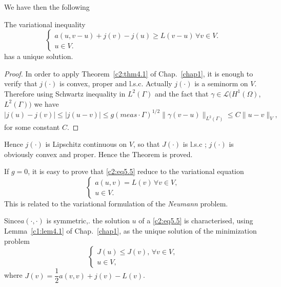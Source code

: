 We have then the following 

\begin{theorem}%
 The variational inequality
\begin{equation}
\begin{cases}
a(u, v-u) + j (v) - j (u) \geq  L (v-u)\, \forall  v \in V.\\ 
u \in V.\tag{5.5}\label{c2:eq5.5}
\end{cases}
\end{equation}
has a unique solution.
\end{theorem}

\begin{proof}
In order to apply Theorem~\ref{c2:thm4.1} of Chap.~\ref{chap1}, it is
enough to verify that $j(\cdot)$ is convex, proper and l.s.c. Actually
$j(\cdot)$ is a seminorm on $V$. Therefore using Schwartz inequality
in $L^2(\Gamma)$ and the fact that $\gamma \in \mathscr{L}
(H^1(\Omega)$, $L^2 
(\Gamma))$ we have  
\begin{equation}
|j(u) - j(v)| \leq | j(u-v) | \leq g (meas \cdot
\Gamma)^{1/2}\parallel \gamma(v-u)\parallel_{L^2(\Gamma)}\leq C \parallel  u - v\parallel_V,
\tag{5.6}\label{c2:eq5.6} 
\end{equation}
for some constant $C$.
\end{proof}

Hence $j(\cdot)$ is Lipschitz continuous on $V$, so that $J(\cdot)$ is
l.s.c ; $j(\cdot)$  is obviously convex and proper. Hence the Theorem
is proved. 

\begin{remark}\label{c2:rem5.1}%
If $g=0$, it is easy to prove that \eqref{c2:eq5.5}  reduce to the
variational equation   
\begin{equation*}
\begin{cases}
a(u, v) = L(v)\, \forall  v \in V,\\
 u \in V.
\end{cases}
\end{equation*}
This is related  to the variational formulation of the
\textit{Neumann} problem. 
\end{remark}

\begin{remark}\label{c2:rem5.2}%
 Since\pageoriginale  $a(\cdot, \cdot)$ is symmetric,. the solution $u$ of a \eqref{c2:eq5.5} is
 characterised, using Lemma~\ref{c1:lem4.1} of Chap.~\ref{chap1}, as
 the unique  solution of  the minimization problem  
 \begin{equation}
\begin{cases}
J(u) \leq J(v) ,\, \forall  v \in V, \\
u \in V, \tag{5.7}\label{c2:eq5.7}
\end{cases}
 \end{equation} 
 where $J(v) = \dfrac{1}{2} a (v, v) + j (v) -L(v)$. 
\end{remark}

